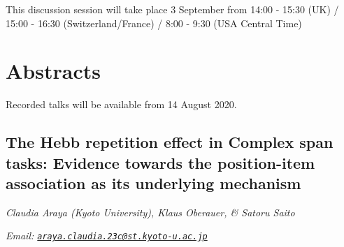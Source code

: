 \documentclass[12pt,]{book}
\begin{document}
This discussion session will take place 3 September from 14:00 - 15:30 (UK) / 15:00 - 16:30 (Switzerland/France) / 8:00 - 9:30 (USA Central Time)

\hypertarget{abstracts-4}{%
\section{Abstracts}\label{abstracts-4}}

Recorded talks will be available from 14 August 2020.

\hypertarget{the-hebb-repetition-effect-in-complex-span-tasks-evidence-towards-the-position-item-association-as-its-underlying-mechanism}{%
\subsection{The Hebb repetition effect in Complex span tasks: Evidence towards the position-item association as its underlying mechanism}\label{the-hebb-repetition-effect-in-complex-span-tasks-evidence-towards-the-position-item-association-as-its-underlying-mechanism}}

\emph{Claudia Araya (Kyoto University), Klaus Oberauer, \& Satoru Saito}

\emph{Email: \href{mailto:araya.claudia.23c@st.kyoto-u.ac.jp}{\nolinkurl{araya.claudia.23c@st.kyoto-u.ac.jp}}}
\end{document}
